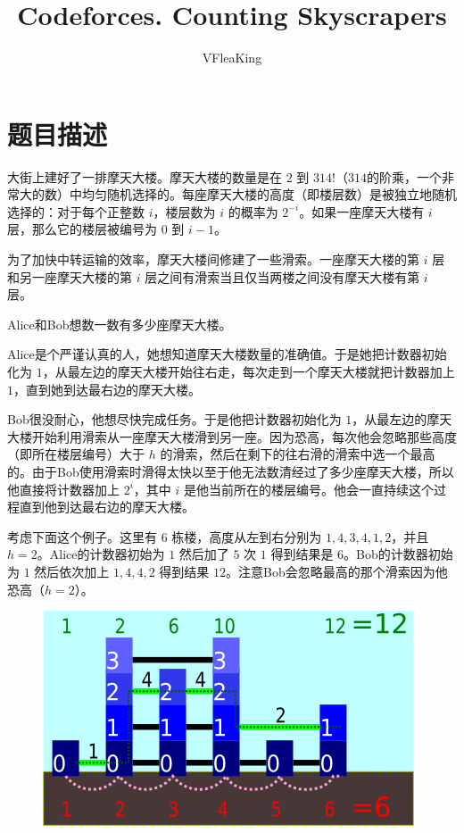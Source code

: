 \documentclass[11pt, a4paper]{article}
\title{Codeforces. Counting Skyscrapers}
\author{VFleaKing}
\begin{document}
\maketitle

\section*{题目描述}
大街上建好了一排摩天大楼。摩天大楼的数量是在 $2$ 到 $314!$（$314$的阶乘，一个非常大的数）中均匀随机选择的。每座摩天大楼的高度（即楼层数）是被独立地随机选择的：对于每个正整数 $i$，楼层数为 $i$ 的概率为 $2^{-i}$。如果一座摩天大楼有 $i$ 层，那么它的楼层被编号为 $0$ 到 $i - 1$。

为了加快中转运输的效率，摩天大楼间修建了一些滑索。一座摩天大楼的第 $i$ 层和另一座摩天大楼的第 $i$ 层之间有滑索当且仅当两楼之间没有摩天大楼有第 $i$ 层。

Alice和Bob想数一数有多少座摩天大楼。

Alice是个严谨认真的人，她想知道摩天大楼数量的准确值。于是她把计数器初始化为 $1$，从最左边的摩天大楼开始往右走，每次走到一个摩天大楼就把计数器加上 $1$，直到她到达最右边的摩天大楼。

Bob很没耐心，他想尽快完成任务。于是他把计数器初始化为 $1$，从最左边的摩天大楼开始利用滑索从一座摩天大楼滑到另一座。因为恐高，每次他会忽略那些高度（即所在楼层编号）大于 $h$ 的滑索，然后在剩下的往右滑的滑索中选一个最高的。由于Bob使用滑索时滑得太快以至于他无法数清经过了多少座摩天大楼，所以他直接将计数器加上 $2^i$，其中 $i$ 是他当前所在的楼层编号。他会一直持续这个过程直到他到达最右边的摩天大楼。

考虑下面这个例子。这里有 $6$ 栋楼，高度从左到右分别为 $1, 4, 3, 4, 1, 2$，并且 $h = 2$。Alice的计数器初始为 $1$ 然后加了 $5$ 次 $1$ 得到结果是 $6$。Bob的计数器初始为 $1$ 然后依次加上 $1, 4, 4, 2$ 得到结果 $12$。注意Bob会忽略最高的那个滑索因为他恐高（$h = 2$）。

\begin{figure}[h]
\centering
\includegraphics[scale=0.7]{sample.png}
\end{figure}
\end{document}

